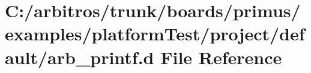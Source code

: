 \hypertarget{boards_2primus_2examples_2platform_test_2project_2default_2arb__printf_8d}{\section{C\-:/arbitros/trunk/boards/primus/examples/platform\-Test/project/default/arb\-\_\-printf.d File Reference}
\label{boards_2primus_2examples_2platform_test_2project_2default_2arb__printf_8d}
}

